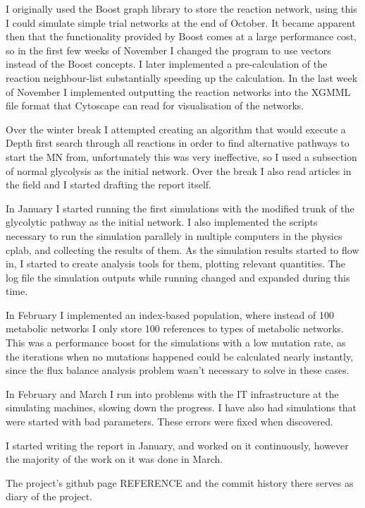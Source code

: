 \documentclass[10pt,a4paper]{article}
\begin{document}
	I originally used the Boost graph library to store the reaction network, using this I could simulate simple trial networks at the end of October. It became apparent then that the functionality provided by Boost comes at a large performance cost, so in the first few weeks of November I changed the program to use vectors instead of the Boost concepts. I later implemented a pre-calculation of the reaction neighbour-list substantially speeding up the calculation. 
	In the last week of November I implemented outputting the reaction networks into the XGMML file format that Cytoscape can read for visualisation of the networks. 

	Over the winter break I attempted creating an algorithm that would execute a Depth first search through all reactions in order to find alternative pathways to start the MN from, unfortunately this was very ineffective, so I used a subsection of normal glycolysis as the initial network. Over the break I also read articles in the field and I started drafting the report itself. 

	In January I started running the first simulations with the modified trunk of the glycolytic pathway as the initial network. I also implemented the scripts necessary to run the simulation parallely in multiple computers in the physics cplab, and collecting the results of them. 
	As the simulation results started to flow in, I started to create analysis tools for them, plotting relevant quantities. The log file the simulation outputs while running changed and expanded during this time. 

	In February I implemented an index-based population, where instead of 100 metabolic networks I only store 100 references to types of metabolic networks. This was a performance boost for the simulations with a low mutation rate, as the iterations when no mutations happened could be calculated nearly instantly, since the flux balance analysis problem wasn't necessary to solve in these cases. 

	In February and March I run into problems with the IT infrastructure at the simulating machines, slowing down the progress. I have also had simulations that were started with bad parameters. These errors were fixed when discovered. 

	I started writing the report in January, and worked on it continuously, however the majority of the work on it was done in March. 

	The project's github page REFERENCE and the commit history there serves as diary of the project. 
	\newpage
\end{document}
